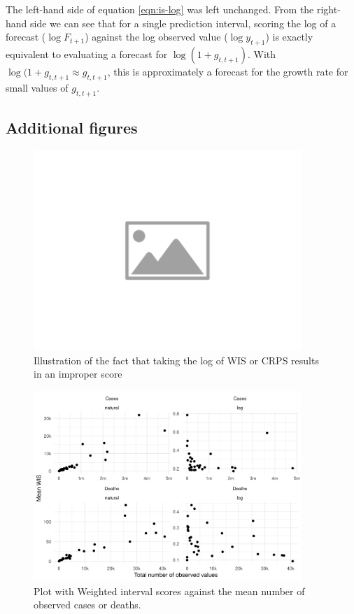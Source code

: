 \documentclass{article}
\begin{document}
The left-hand side of equation \ref{eqn:is-log} was left unchanged. From the right-hand side we can see that for a single prediction interval, scoring the log of a forecast ($\log F_{t+1}$) against the log observed value ($\log y_{t+1}$) is exactly equivalent to evaluating a forecast for $\log (1 + g_{t, t+1})$. With $\log (1 + g_{t, t+1} \approx g_{t, t+1}$, this is approximately a forecast for the growth rate for small values of $g_{t, t+1}$. 


\subsection{Additional figures}




\begin{figure}[h!]
    \centering
    \includegraphics[width=0.9\textwidth]{output/placeholder-image.png}
    \caption{Illustration of the fact that taking the log of WIS or CRPS results in an improper score}
    \label{fig:log-improper}
\end{figure}


\begin{figure}[h!]
    \centering
    \includegraphics[width=0.9\textwidth]{output/figures/HUB-mean-scores-vs-total.png}
    \caption{Plot with Weighted interval scores against the mean number of observed cases or deaths.}
    \label{fig:HUB-mean-scores-total}
\end{figure}
\end{document}
